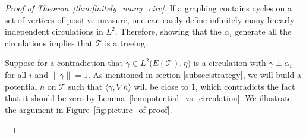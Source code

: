 \documentclass[10pt]{article}
\theoremstyle{plain}
\theoremstyle{remark}
\newcommand{\1}{\mathbbm{1}}
\newcommand{\mcT}{\mathcal{T}}
\numberwithin{equation}{section}
\begin{document}
\begin{proof}[Proof of Theorem~\ref{thm:finitely_many_circ}] 
      If a graphing contains cycles on a set of vertices of positive measure, one can easily define infinitely many linearly independent circulations in $L^2$. Therefore, showing that the $\alpha_i$ generate all the circulations implies that $\mcT$ is a treeing.
      
      Suppose for a contradiction that $\gamma \in L^2\big(E(\mcT), \eta\big)$ is a circulation with $\gamma \perp \alpha_i$ for all $i$ and $\|\gamma\|=1$. As mentioned in section \ref{subsec:strategy}, we will build a potential $h$ on $\mcT$ such that $\langle\gamma, \nabla h\rangle$ will be close to $1$, which contradicts the fact that it should be zero by Lemma~\ref{lem:potential_vs_circulation}. We illustrate the argument in Figure~\ref{fig:picture_of proof}. 

\begin{figure}
    \centering



\begin{tikzpicture}[x=0.75pt,y=0.75pt,yscale=-1,xscale=1]


\end{tikzpicture}
\end{figure}
\end{proof}
\end{document}
